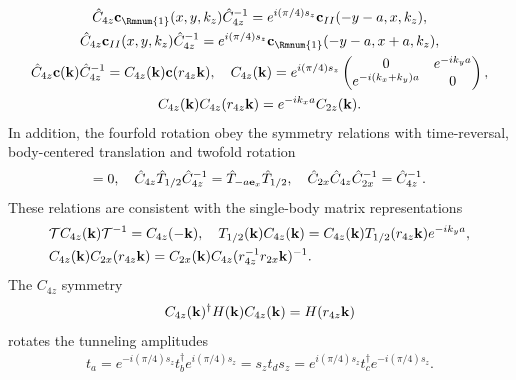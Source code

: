 \begin{gather}
\hat{C}_{4z}{\bf c}_{\Rmnum{1}}(x,y,k_z)\hat{C}_{4z}^{-1}=e^{i(\pi/4)s_z}{\bf c}_{II}(-y-a,x,k_z),\\
\hat{C}_{4z}{\bf c}_{II}(x,y,k_z)\hat{C}_{4z}^{-1}=e^{i(\pi/4)s_z}{\bf c}_{\Rmnum{1}}(-y-a,x+a,k_z),\nonumber\\
\hat{C}_{4z}{\bf c}({\bf k})\hat{C}_{4z}^{-1}=C_{4z}({\bf k}){\bf c}(r_{4z}{\bf k}),\quad C_{4z}({\bf k})=e^{i(\pi/4)s_z}\begin{pmatrix}0&e^{-ik_ya}\\e^{-i(k_x+k_y)a}&0\end{pmatrix},\\C_{4z}({\bf k})C_{4z}(r_{4z}{\bf k})=e^{-ik_xa}C_{2z}({\bf k}).\nonumber\end{gather} In addition, the fourfold rotation obey the symmetry relations with time-reversal, body-centered translation and twofold rotation \begin{align}[\hat{\mathcal{T}},\hat{C}_{4z}]=0,\quad\hat{C}_{4z}\hat{T}_{1/2}\hat{C}_{4z}^{-1}=\hat{T}_{-a{\bf e}_x}\hat{T}_{1/2},\quad\hat{C}_{2x}\hat{C}_{4z}\hat{C}_{2x}^{-1}=\hat{C}_{4z}^{-1}.\end{align} These relations are consistent with the single-body matrix representations \begin{gather}\begin{split}&\mathcal{T}C_{4z}({\bf k})\mathcal{T}^{-1}=C_{4z}(-{\bf k}),\quad T_{1/2}({\bf k})C_{4z}({\bf k})=C_{4z}({\bf k})T_{1/2}(r_{4z}{\bf k})e^{-ik_ya},\\&C_{4z}({\bf k})C_{2x}(r_{4z}{\bf k})=C_{2x}({\bf k})C_{4z}(r_{4z}^{-1}r_{2x}{\bf k})^{-1}.\end{split}\end{gather} The $C_{4z}$ symmetry \begin{align}C_{4z}({\bf k})^\dagger H({\bf k})C_{4z}({\bf k})=H(r_{4z}{\bf k})\end{align} rotates the tunneling amplitudes \begin{align}t_a=e^{-i(\pi/4)s_z}t_b^\dagger e^{i(\pi/4)s_z}=s_zt_ds_z=e^{i(\pi/4)s_z}t_c^\dagger e^{-i(\pi/4)s_z}.\label{C4zsymm}\end{align}

